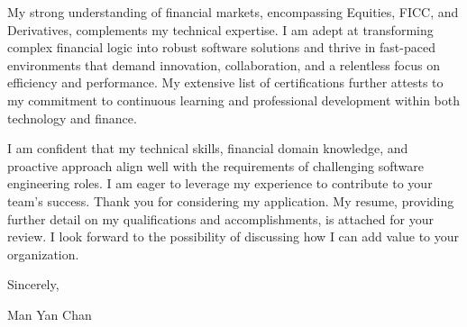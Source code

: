 \documentclass[11pt, a4paper]{article} %
\begin{document}
My strong understanding of financial markets, encompassing Equities, FICC, and Derivatives, complements my technical expertise. I am adept at transforming complex financial logic into robust software solutions and thrive in fast-paced environments that demand innovation, collaboration, and a relentless focus on efficiency and performance. My extensive list of certifications further attests to my commitment to continuous learning and professional development within both technology and finance.

I am confident that my technical skills, financial domain knowledge, and proactive approach align well with the requirements of challenging software engineering roles. I am eager to leverage my experience to contribute to your team's success. Thank you for considering my application. My resume, providing further detail on my qualifications and accomplishments, is attached for your review. I look forward to the possibility of discussing how I can add value to your organization.

\medskip %
Sincerely,

\vspace{3\baselineskip} %

Man Yan Chan %

\end{document}
